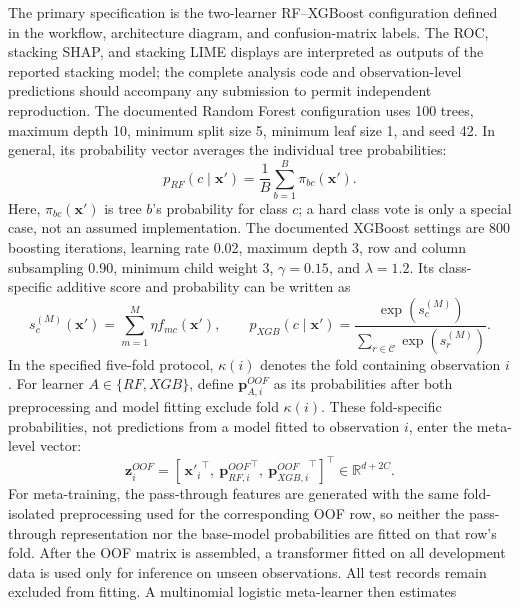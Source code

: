 \documentclass[a4paper,fleqn]{cas-dc}
\begin{document}
The primary specification is the two-learner RF--XGBoost configuration defined in the workflow, architecture diagram, and confusion-matrix labels. The ROC, stacking SHAP, and stacking LIME displays are interpreted as outputs of the reported stacking model; the complete analysis code and observation-level predictions should accompany any submission to permit independent reproduction. The documented Random Forest configuration \cite{breiman2001} uses 100 trees, maximum depth 10, minimum split size 5, minimum leaf size 1, and seed 42. In general, its probability vector averages the individual tree probabilities:
\begin{equation}
p_{RF}(c\mid\mathbf{x}')=\frac{1}{B}\sum_{b=1}^{B}
\pi_{bc}(\mathbf{x}').
\label{eq:rf}
\end{equation}
Here, $\pi_{bc}(\mathbf{x}')$ is tree $b$'s probability for class $c$; a hard class vote is only a special case, not an assumed implementation. The documented XGBoost settings \cite{chen2016} are 800 boosting iterations, learning rate 0.02, maximum depth 3, row and column subsampling 0.90, minimum child weight 3, $\gamma=0.15$, and $\lambda=1.2$. Its class-specific additive score and probability can be written as
\begin{equation}
s_c^{(M)}(\mathbf{x}')=\sum_{m=1}^{M}\eta f_{mc}(\mathbf{x}'),
\qquad
p_{XGB}(c\mid\mathbf{x}')=
\frac{\exp(s_c^{(M)})}{\sum_{r\in\mathcal{C}}\exp(s_r^{(M)})}.
\label{eq:xgb}
\end{equation}
In the specified five-fold protocol, $\kappa(i)$ denotes the fold containing observation $i$. For learner $A\in\{RF,XGB\}$, define $\mathbf{p}_{A,i}^{OOF}$ as its probabilities after both preprocessing and model fitting exclude fold $\kappa(i)$. These fold-specific probabilities, not predictions from a model fitted to observation $i$, enter the meta-level vector:
\begin{equation}
\mathbf{z}^{OOF}_i=\left[\,{\mathbf{x}'_i}^{\!\top},\
{\mathbf{p}_{RF,i}^{OOF}}^{\!\top},\
{\mathbf{p}_{XGB,i}^{OOF}}^{\!\top}\right]^{\!\top}
\in\mathbb{R}^{d+2C}.
\label{eq:oofvector}
\end{equation}
For meta-training, the pass-through features are generated with the same fold-isolated preprocessing used for the corresponding OOF row, so neither the pass-through representation nor the base-model probabilities are fitted on that row's fold. After the OOF matrix is assembled, a transformer fitted on all development data is used only for inference on unseen observations. All test records remain excluded from fitting. A multinomial logistic meta-learner then estimates
\end{document}
